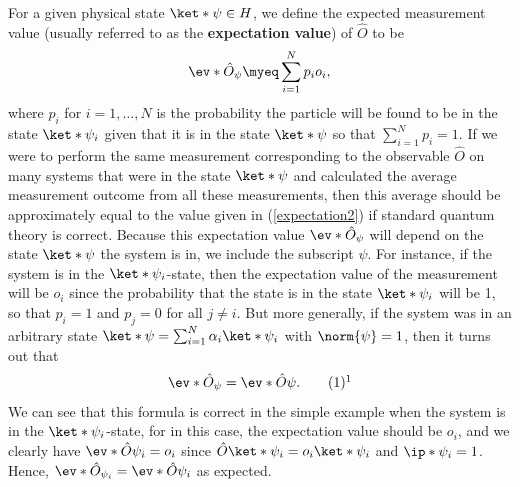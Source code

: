 \documentclass[12pt]{report}
\begin{document}
For a given physical state $\ket*{\psi}\in H$, we define the expected measurement value (usually referred to as the \textbf{expectation value}) of $\hat{O}$ to be 
\begin{equation}\label{expectation2}
\ev*{\hat{O}}_\psi\myeq\sum_{i=1}^N p_io_i,
\end{equation}
where %
%
$p_i$  %
%
for $i=1,\ldots, N$ is the probability the particle will be found to be in the state $\ket*{\psi_i}$ given that it is in the state $\ket*{\psi}$ so that  $\sum_{i=1}^N p_i=1$. If we were to perform the same measurement corresponding to the observable $\hat{O}$ on many systems that were in the state $\ket*{\psi}$ and calculated the average measurement outcome from all these measurements, then this average should be approximately equal to the value given in (\ref{expectation2}) if  standard quantum theory is correct. Because this expectation value $\ev*{\hat{O}}_\psi$ will depend on the state $\ket*{\psi}$ the system is in, we include the subscript $\psi$. For instance, if the system is in the $\ket*{\psi_i}$-state, then the expectation value of the measurement will be $o_i$ since the probability that the state is in the state $\ket*{\psi_i}$ will be 1, so that $p_i=1$ and $p_j=0$ for all $j\neq i$. But more generally, if the system was in an arbitrary state $\ket*{\psi}=\sum_{i=1}^N \alpha_i\ket*{\psi_i}$ with $\norm{\psi}=1$, then it turns out that 
\begin{equation}\refstepcounter{equation}\label{evev}\ev*{\hat{O}}_\psi=\ev*{\hat{O}}{\psi}.\tag{\theequation}\protect\footnotemark
\end{equation}We can see that this formula is correct in the simple example when the system is in the $\ket*{\psi_i}$-state, for in this case, the expectation value should be $o_i$, and we clearly have $\ev*{\hat{O}}{\psi_i}=o_i$ since $\hat{O}\ket*{\psi_i}=o_i\ket*{\psi_i}$ and $\ip*{\psi_i}=1$. Hence, $\ev*{\hat{O}}_{\psi_i}=\ev*{\hat{O}}{\psi_i}$ as expected.
\end{document}

